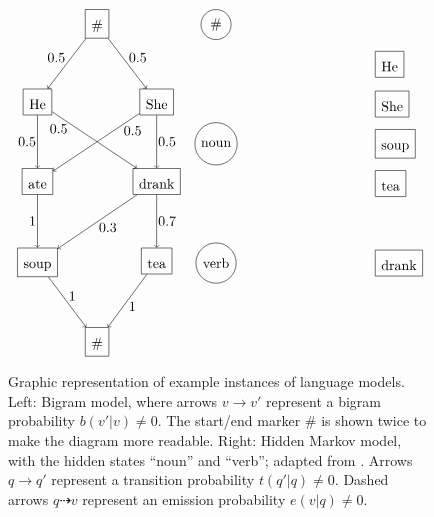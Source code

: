 \begin{figure}[t!]
 \label{fig:language-models}
 \caption{Graphic representation of example instances of language models. Left:
 Bigram model, where arrows $v\to v'$ represent a bigram probability
 $b(v'|v)\neq0$.  The start/end marker $\#$ is shown twice to make the diagram
 more readable. Right: Hidden Markov model, with the hidden states ``noun'' and
 ``verb''; adapted from \cite{nel13}. Arrows $q\to q'$ represent
 a transition probability $t(q'|q)\neq0$. Dashed arrows $q\dashrightarrow v$ represent an
 emission probability $e(v|q)\neq0$.}
 \begin{align*}
  \begin{tikzpicture}[baseline=(current bounding box.north)]
   \begin{scope}[every node/.style={rectangle,draw,text height=1.0em,inner sep=1ex,anchor=north}]
    \node (v0) at (1.5,2) {\#};
    \node (v11) at (0,0) {He};
    \node (v12) at (3,0) {She};
    \node (v21) at (0,-2) {ate};
    \node (v22) at (3,-2) {drank};
    \node (v31) at (0,-4) {soup};
    \node (v32) at (3,-4) {tea};
    \node (v4) at (1.5,-6) {\#};
   \end{scope}
   \begin{scope}[every node/.style={rectangle,inner sep=0.2ex}]
    \draw[->] (v0) -- node[auto,swap] {$0.5$} (v11);
    \draw[->] (v0) -- node[auto] {$0.5$} (v12);
    \draw[->] (v11) -- node[auto,swap] {$0.5$} (v21);
    \draw[->] (v12) -- node[auto,pos=0.2] {$0.5$} (v21);
    \draw[->] (v11) -- node[auto,pos=0.2,swap] {$0.5$} (v22);
    \draw[->] (v12) -- node[auto] {$0.5$} (v22);
    \draw[->] (v21) -- node[auto,swap] {$1$} (v31);
    \draw[->] (v22) -- node[auto] {$0.3$} (v31);
    \draw[->] (v22) -- node[auto] {$0.7$} (v32);
    \draw[->] (v31) -- node[auto] {$1$} (v4);
    \draw[->] (v32) -- node[auto] {$1$} (v4);
   \end{scope}
  \end{tikzpicture}
  &&
  \begin{tikzpicture}[baseline=(current bounding box.north)]
   \begin{scope}[every node/.style={circle,draw}]
    \node (q0) at (0,6) {\#};
    \node (q1) at (0,3) {noun};
    \node (q2) at (0,0) {verb};
   \end{scope}
   \begin{scope}[every node/.style={rectangle,draw,text height=1.0em,inner sep=1ex,anchor=west}]
    \node (v11) at (4,5) {He};
    \node (v12) at (4,4) {She};
    \node (v13) at (4,3) {soup};
    \node (v14) at (4,2) {tea};
    \node (v21) at (4,0) {drank};

\end{scope}
\end{tikzpicture}
\end{align*}
\end{figure}
